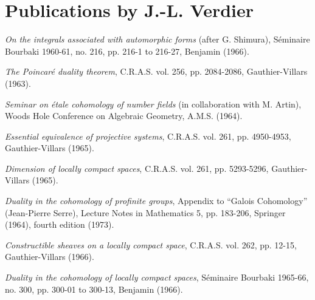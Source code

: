 \chapter*{Publications by J.-L. Verdier}

\begin{description}
\item[{[01]}] \emph{On the integrals associated with automorphic forms}
(after G. Shimura), Séminaire Bourbaki 1960-61, no. 216,
pp. 216-1 to 216-27, Benjamin (1966).

\item[{[02]}] \emph{The Poincaré duality theorem}, C.R.A.S. vol. 256,
pp. 2084-2086, Gauthier-Villars (1963).

\item[{[03]}] \emph{Seminar on étale cohomology of number fields}
(in collaboration with M. Artin), Woods Hole Conference on Algebraic
Geometry, A.M.S. (1964).

\item[{[04]}] \emph{Essential equivalence of projective systems}, C.R.A.S.
vol. 261, pp. 4950-4953, Gauthier-Villars (1965).

\item[{[05]}] \emph{Dimension of locally compact spaces}, C.R.A.S. vol. 261,
pp. 5293-5296, Gauthier-Villars (1965).

\item[{[06]}] \emph{Duality in the cohomology of profinite groups}, Appendix to
``Galois Cohomology'' (Jean-Pierre Serre), Lecture Notes in Mathematics 5,
pp. 183-206, Springer (1964), fourth edition (1973).

\item[{[07]}] \emph{Constructible sheaves on a locally compact space},
C.R.A.S. vol. 262, pp. 12-15, Gauthier-Villars (1966).

\item[{[08]}] \emph{Duality in the cohomology of locally compact spaces},
Séminaire Bourbaki 1965-66, no. 300, pp. 300-01 to 300-13,
Benjamin (1966).


\end{description}
